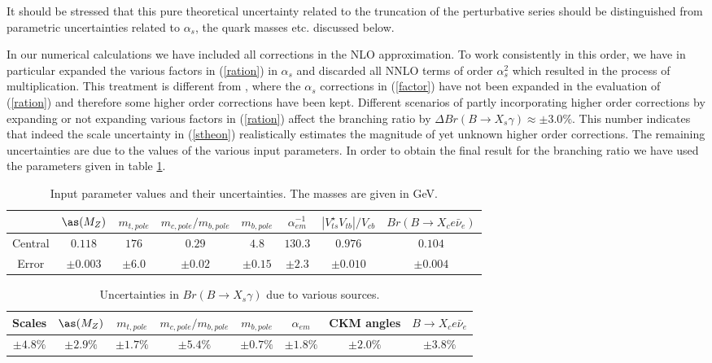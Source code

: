 It should be stressed that this pure theoretical 
uncertainty related to the truncation of the perturbative series
should be distinguished from parametric uncertainties related
to $\alpha_s$, the quark masses etc. discussed below.

In our numerical calculations we have included all corrections
in the NLO approximation. To work  consistently
in this order, we have in particular
expanded the various factors in (\ref{ration}) in  $\alpha_s$ and discarded
all NNLO terms of order $\alpha_s^2$ which resulted in the process
of multiplication. This treatment is different
from \cite{CZMM,GREUB}, where the $\alpha_s$ corrections in (\ref{factor}) 
have not been expanded in the evaluation of 
(\ref{ration}) and therefore some higher order corrections have been kept.
Different scenarios of partly incorporating higher order corrections
by expanding or not expanding various factors in (\ref{ration})
affect the branching ratio by $\Delta Br(B\rightarrow X_s\gamma)\approx
\pm 3.0 \%$. This number indicates that indeed the scale uncertainty
in (\ref{stheon}) realistically  estimates the magnitude of yet
unknown higher order corrections.   
The remaining uncertainties are due to the values of the various 
input parameters.
In order to obtain the final result for the branching ratio
we have used  the  parameters given in table \ref{tabbsg}.

\begin{table}[htb]
\caption[]{Input parameter values and their uncertainties.
The masses are given in GeV.
\label{tabbsg}}
\begin{center}
\begin{tabular}{|c|c|c|c|c|c|c|c|}
\hline
 & $\as(M_Z)$ & $m_{t,pole}$   & $m_{c,pole}/m_{b,pole}$ 
& $m_{b,pole}$ & $\alpha_{em}^{-1}$ 
& $|V_{ts}^{\star}V_{tb}|/V_{cb}$ & $Br(B\to X_c e\bar\nu_e)$ \\
\hline
{\rm Central} & $0.118$ & $176$  & $0.29$ & $4.8$  &  
  $130.3$  & $0.976$ &$0.104$ \\
\hline
{\rm Error} & $\pm 0.003$   & $\pm 6.0$  & $\pm 0.02$ & $\pm 0.15$  &  
  $\pm 2.3$  & $\pm 0.010$ &$\pm 0.004$ \\
\hline
\end{tabular} 
\end{center}
\end{table}

\begin{table}[htb]
\caption[]{Uncertainties in $Br(B \to X_s\gamma)$ due to various 
sources.\label{tab:akh2}}
\begin{center}
\begin{tabular}{|c|c|c|c|c|c|c|c|}
\hline
{\rm Scales} & $\as(M_Z)$ & $m_{t,pole}$  & $m_{c,pole}/m_{b,pole}$ 
& $m_{b,pole}$ & $\alpha_{em}$ & CKM angles & $B\to X_c e\bar\nu_e$ \\
\hline
$\pm 4.8\%$ & $\pm 2.9\%$   & $\pm 1.7\%$  & $\pm 5.4\%$ & $\pm 0.7\%$  &  
  $\pm 1.8\%$  & $\pm 2.0\%$ &$\pm  3.8\%$ \\
\hline
\end{tabular} 
\end{center}
\end{table}

